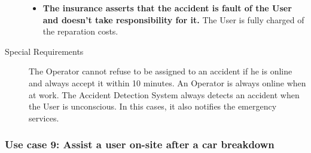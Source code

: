 \begin{description}
\begin{itemize}
				\item \textbf{The insurance asserts that the accident is fault of the User and doesn't take responsibility for it.} The User is fully charged of the reparation costs.
			\end{itemize}
			\item[Special Requirements] The Operator cannot refuse to be assigned to an accident if he is online and always accept it within 10 minutes. An Operator is always online when at work. %
			The Accident Detection System always detects an accident when the User is unconscious. In this cases, it also notifies the emergency services.
		\end{description}

	\subsubsection{Use case 9: Assist a user on-site after a car breakdown}
